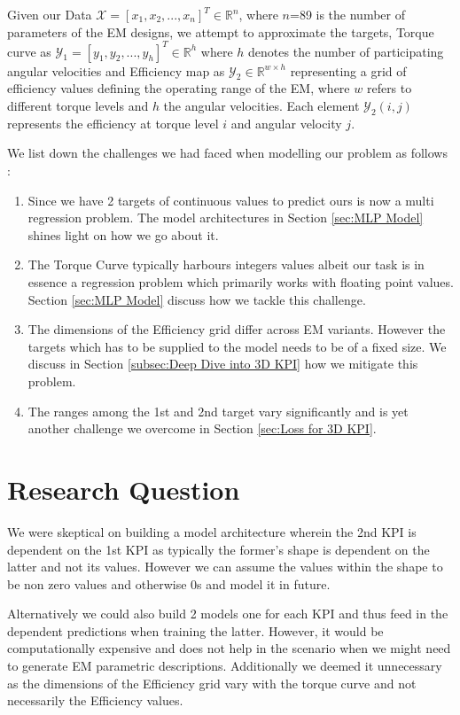 \documentclass{report} %
\begin{document}
Given our Data $\mathcal{X}  = [x_1, x_2, ..., x_{n}]^T \in \mathbb{R}^{n}$, where $n$=89 is the number of parameters of the \ac{EM} designs, we attempt to approximate the targets, 
Torque curve as $\mathcal{Y}_1 = [y_1, y_2, ..., y_{h}]^T \in \mathbb{R}^{h}$ where $h$ denotes the number of participating angular velocities and 
Efficiency map as $\mathcal{Y}_2 \in \mathbb{R}^{w \times h}$ representing a grid of efficiency values defining the operating range of the \ac{EM}, where $w$ refers to 
different torque levels and $h$ the angular velocities. Each element $\mathcal{Y}_2(i,j)$ represents the efficiency at torque level $i$ and angular velocity $j$. 

We list down the challenges we had faced when modelling our problem as follows : 
\begin{enumerate}
    \item Since we have 2 targets of continuous values to predict ours is now a multi regression problem. The model architectures in Section \ref{sec:MLP Model} 
    shines light on how we go about it.
    \item The Torque Curve typically harbours integers values albeit our task is in essence a regression problem which primarily works with floating point values. 
    Section \ref{sec:MLP Model} discuss how we tackle this challenge. 
    \item The dimensions of the Efficiency grid differ across \ac{EM} variants. However the targets which has to be supplied to the model needs to be of a fixed size.
     We discuss in Section \ref{subsec:Deep Dive into 3D KPI} how we mitigate this problem.
    \item The ranges among the 1st and 2nd target vary significantly and is yet another challenge we overcome in Section \ref{sec:Loss for 3D KPI}.
\end{enumerate}

\section{Research Question}\label{sec:Research Question}

We were skeptical on building a model architecture wherein the 2nd KPI is dependent on the 1st KPI as typically the former's shape is dependent on the latter 
and not its values. However we can assume the values within the shape to be non zero values and otherwise 0s and model it in future.

Alternatively we could also build 2 models one for each KPI and thus feed in the dependent predictions when training the latter. 
However, it would be computationally expensive and does not help in the scenario when we might need to generate \ac{EM} parametric descriptions.
Additionally we deemed it unnecessary as the dimensions of the Efficiency grid vary with the torque curve and not necessarily the Efficiency values. 
\end{document}
